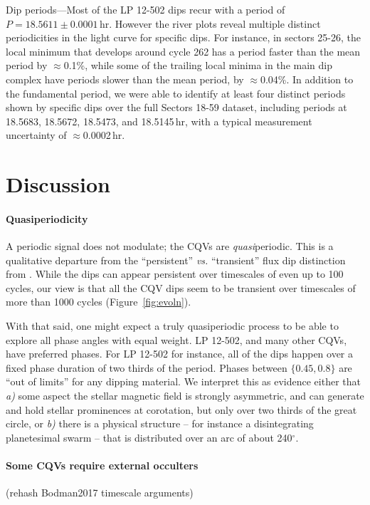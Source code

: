 \documentclass[11pt,twocolumn,tighten]{aastex63}
\begin{document}
{\sc Dip periods}---Most of the LP 12-502 dips recur with a period of
$P=18.5611 \pm 0.0001$\,hr.  However the river plots reveal multiple
distinct periodicities in the light curve for specific dips.  For
instance, in sectors 25-26, the local minimum that develops around
cycle 262 has a period faster than the mean period by $\approx$0.1\%,
while some of the trailing local minima in the main dip complex have
periods slower than the mean period, by $\approx$0.04\%.  In addition
to the fundamental period, we were able to identify at least four
distinct periods shown by specific dips over the full Sectors 18-59
dataset, including periods at 18.5683, 18.5672, 18.5473, and
18.5145\,hr, with a typical measurement uncertainty of
$\approx$0.0002\,hr.




\section{Discussion}
\label{sec:discussion}

\paragraph{Quasiperiodicity}
A periodic signal does not modulate; the CQVs are {\it quasi}periodic.
This is a qualitative departure from
the ``persistent'' {\it vs.} ``transient'' flux dip distinction from 
\citet{2017AJ....153..152S}.  While the dips can appear persistent
over timescales of even up to 100 cycles, our view is that all the CQV
dips seem to be transient over timescales of more than 1000 cycles
(Figure~\ref{fig:evoln}).

With that said, one might expect a truly quasiperiodic process to be
able to explore all phase angles with equal weight.  LP 12-502, and
many other CQVs, have preferred phases.  For LP 12-502 for instance,
all of the dips happen over a fixed phase duration of two thirds of
the period.  Phases between $\{0.45,0.8\}$ are ``out of limits'' for
any dipping material.  We interpret this as evidence
either that {\it a)} some aspect the stellar magnetic field is
strongly asymmetric, and can generate and hold stellar prominences at
corotation, but only over two thirds of the great circle,
or {\it b)} there is a physical structure -- for instance a
disintegrating planetesimal swarm -- that is distributed over an arc
of about 240$^\circ$.


\paragraph{Some CQVs require external occulters}
(rehash Bodman2017 timescale arguments)
\end{document}

